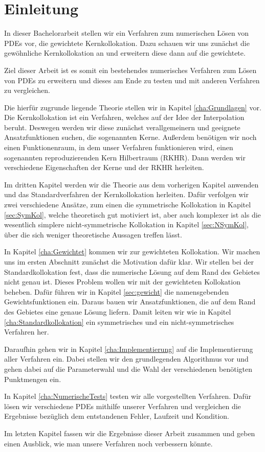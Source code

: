 \chapter{Einleitung}
\label{cha:Einleitung}
In dieser Bachelorarbeit stellen wir ein Verfahren zum numerischen Lösen von \acp{PDE} vor, die gewichtete Kernkollokation. Dazu schauen wir uns zunächst die gewöhnliche Kernkollokation an und erweitern diese dann auf die gewichtete.

Ziel dieser Arbeit ist es somit ein bestehendes numerisches Verfahren zum Lösen von \acp{PDE} zu erweitern und dieses am Ende zu testen und mit anderen Verfahren zu vergleichen.

Die hierfür zugrunde liegende Theorie stellen wir in Kapitel \ref{cha:Grundlagen} vor. Die Kernkollokation ist ein Verfahren, welches auf der Idee der Interpolation beruht. Deswegen werden wir diese zunächst verallgemeinern und geeignete Ansatzfunktionen suchen, die sogenannten Kerne. Außerdem benötigen wir noch einen Funktionenraum, in dem unser Verfahren \glqq funktionieren\grqq{} wird, einen sogenannten reproduzierenden Kern Hilbertraum (\acs{RKHR}). Dann werden wir verschiedene Eigenschaften der Kerne und der \ac{RKHR} herleiten.

Im dritten Kapitel werden wir die Theorie aus dem vorherigen Kapitel anwenden und das Standardverfahren der Kernkollokation herleiten. Dafür verfolgen wir zwei verschiedene Ansätze, zum einen die symmetrische Kollokation in Kapitel \ref{sec:SymKol}, welche theoretisch gut motiviert ist, aber auch komplexer ist als die wesentlich simplere nicht-symmetrische Kollokation in Kapitel \ref{sec:NSymKol}, über die sich weniger theoretische Aussagen treffen lässt.

In Kapitel \ref{cha:Gewichtet} kommen wir zur gewichteten Kollokation. Wir machen uns im ersten Abschnitt zunächst die Motivation dafür klar. Wir stellen bei der Standardkollokation fest, dass die numerische Lösung auf dem Rand des Gebietes nicht genau ist. Dieses Problem wollen wir mit der gewichteten Kollokation beheben. Dafür führen wir in Kapitel \ref{sec:gewicht} die namensgebenden Gewichtsfunktionen ein. Daraus bauen wir Ansatzfunktionen, die auf dem Rand des Gebietes eine genaue Lösung liefern. Damit leiten wir wie in Kapitel \ref{cha:Standardkollokation} ein symmetrisches und ein nicht-symmetrisches Verfahren her.

Daraufhin gehen wir in Kapitel \ref{cha:Implementierung} auf die Implementierung aller Verfahren ein. Dabei stellen wir den grundlegenden Algorithmus vor und gehen dabei auf die Parameterwahl und die Wahl der verschiedenen benötigten Punktmengen ein.

In Kapitel \ref{cha:NumerischeTests} testen wir alle vorgestellten Verfahren. Dafür lösen wir verschiedene \acp{PDE} mithilfe unserer Verfahren und vergleichen die Ergebnisse bezüglich dem entstandenen Fehler, Laufzeit und Kondition.

Im letzten Kapitel fassen wir die Ergebnisse dieser Arbeit zusammen und geben einen Ausblick, wie man unsere Verfahren noch verbessern könnte.

\glsresetall